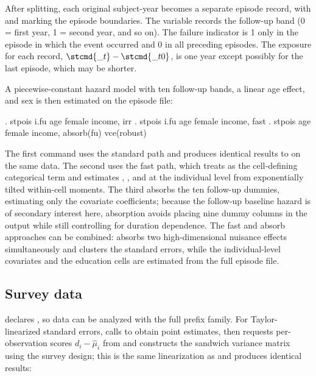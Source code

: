 \documentclass[12pt,a4paper]{article}
\begin{document}
\noindent After splitting, each original subject-year becomes a separate
episode record, with  and  marking the episode
boundaries. The variable  records the follow-up band (0 =
first year, 1 = second year, and so on). The failure indicator
 is 1 only in the episode in which the event occurred and 0
in all preceding episodes. The exposure for each record,
\(\stcmd{\_t} - \stcmd{\_t0}\), is one year except possibly for the last
episode, which may be shorter.

A piecewise-constant hazard model with ten follow-up bands, a linear age
effect, and sex is then estimated on the episode file:

\begin{stlog}
. stpois i.fu age female income, irr
. stpois i.fu age female income, fast
. stpois age female income, absorb(fu) vce(robust)
\end{stlog}

\noindent The first command uses the standard path and produces
identical results to  on the
same data. The second uses the fast path, which treats  as
the cell-defining categorical term and estimates ,
, and  at the individual level from
exponentially tilted within-cell moments. The third absorbs the ten
follow-up dummies, estimating only the covariate coefficients; because
the follow-up baseline hazard is of secondary interest here, absorption
avoids placing nine dummy columns in the output while still controlling
for duration dependence. The fast and absorb approaches can be combined:
absorbs two high-dimensional nuisance effects simultaneously and
clusters the standard errors, while the individual-level covariates and
the education cells are estimated from the full episode file.

\subsection{Survey data}\label{survey-data}

\label{sec:svy}

 declares , so
 data can be analyzed with the full  prefix
family. For Taylor-linearized standard errors,  calls
 to obtain point estimates, then requests per-observation
scores \(d_i - \hat{\mu}_i\) from  and constructs the
sandwich variance matrix using the survey design; this is the same
linearization as  and produces identical results:
\end{document}
